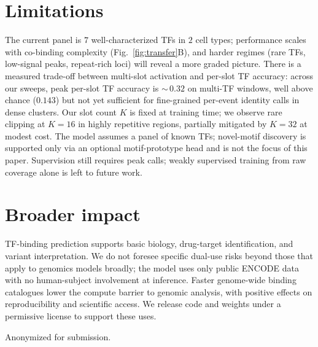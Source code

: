 \documentclass{article}
\begin{document}
\section{Limitations}
\label{sec:limit}
The current panel is $7$ well-characterized TFs in $2$ cell types; performance scales with co-binding complexity (Fig.~\ref{fig:transfer}B), and harder regimes (rare TFs, low-signal peaks, repeat-rich loci) will reveal a more graded picture. There is a measured trade-off between multi-slot activation and per-slot TF accuracy: across our sweeps, peak per-slot TF accuracy is $\sim$\,$0.32$ on multi-TF windows, well above chance ($0.143$) but not yet sufficient for fine-grained per-event identity calls in dense clusters. Our slot count $K$ is fixed at training time; we observe rare clipping at $K{=}16$ in highly repetitive regions, partially mitigated by $K{=}32$ at modest cost. The model assumes a panel of known TFs; novel-motif discovery is supported only via an optional motif-prototype head and is not the focus of this paper. Supervision still requires peak calls; weakly supervised training from raw coverage alone is left to future work.

\section{Broader impact}
TF-binding prediction supports basic biology, drug-target identification, and variant interpretation. We do not foresee specific dual-use risks beyond those that apply to genomics models broadly; the model uses only public ENCODE data with no human-subject involvement at inference. Faster genome-wide binding catalogues lower the compute barrier to genomic analysis, with positive effects on reproducibility and scientific access. We release code and weights under a permissive license to support these uses.

\begin{ack}
Anonymized for submission.
\end{ack}
\end{document}
